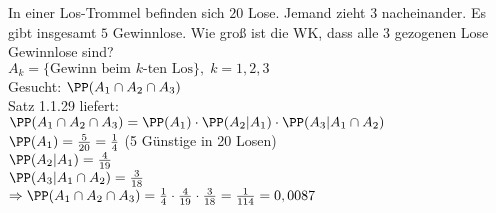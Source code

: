 In einer Los-Trommel befinden sich $20$ Lose. Jemand zieht $3$ nacheinander. Es gibt insgesamt $5$ Gewinnlose. Wie groß ist die WK, dass alle $3$ gezogenen Lose Gewinnlose sind?\\
$A_k=\{\text{Gewinn beim $k$-ten Los}\}, \; k=1,2,3$\\
Gesucht: $\PP(A_1\cap A_2 \cap A_3)$\\
Satz 1.1.29 liefert: \\
$\PP(A_1 \cap A_2 \cap A_3)=\PP(A_1) \cdot \PP(A_2 | A_1) \cdot \PP(A_3 | A_1 \cap A_2)$\\
$\PP(A_1) = \frac{5}{20}= \frac{1}{4}$ (5 Günstige in 20 Losen)\\
$\PP(A_2 | A_1) = \frac{4}{19}$\\
$\PP(A_3 | A_1 \cap A_2) = \frac{3}{18}$\\
$\Rightarrow \PP(A_1 \cap A_2 \cap A_3)=\frac{1}{4}\cdot \frac{4}{19}\cdot \frac{3}{18}=\frac{1}{114}=0,0087$





